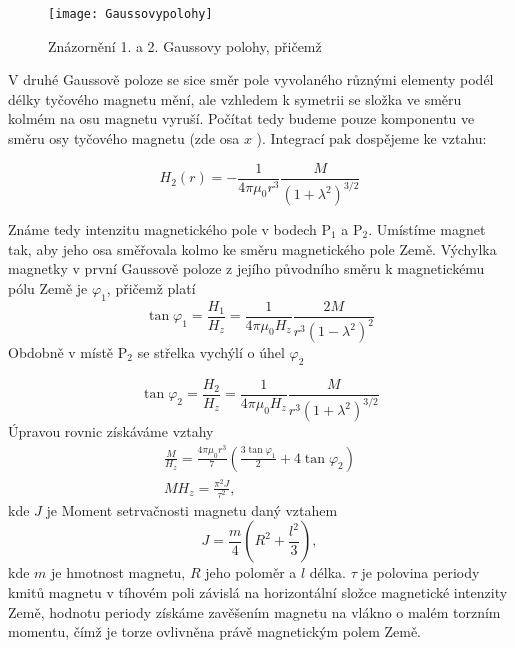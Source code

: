 \documentclass[czech,11pt,a4paper]{article}
\begin{document}
	\begin{figure}[H]
	\begin{center}
		
		\texttt{[image: Gaussovypolohy]} 
		\caption{Znázornění 1. a 2. Gaussovy polohy, přičemž }
	\end{center}
	
	\end{figure} 
	
	\begin{multicols}{2}
	V druhé Gaussově poloze se sice směr pole vyvolaného různými elementy podél délky tyčového magnetu mění, ale vzhledem k symetrii se složka ve směru kolmém na osu magnetu vyruší. Počítat tedy budeme pouze komponentu ve směru osy tyčového magnetu (zde osa $x$ ). Integrací pak dospějeme ke vztahu:
	
	\begin{equation}
		H_{2}(r) =-\frac{1}{4 \pi \mu_{0} r^{3}} \frac{M}{\left(1+\lambda^{2}\right)^{3 / 2}}
	\end{equation}
	
	Známe tedy intenzitu magnetického pole v bodech $\mathrm{P}_{1}$ a $\mathrm{P}_{2}$. Umístíme magnet tak, aby jeho osa směřovala kolmo ke směru magnetického pole Země. Výchylka magnetky v první Gaussově poloze z jejího původního směru k magnetickému pólu Země je $\varphi_{1}$, přičemž platí
	\begin{equation}
		\tan \varphi_{1}=\frac{H_{1}}{H_{z}}=\frac{1}{4 \pi \mu_{0} H_{z}} \frac{2 M}{r^{3}\left(1-\lambda^{2}\right)^{2}}
	\end{equation}
	Obdobně v místě $\mathrm{P}_{2}$ se střelka vychýlí o úhel $\varphi_{2}$
	
\begin{equation}
		\tan \varphi_{2}=\frac{H_{2}}{H_{z}}=\frac{1}{4 \pi \mu_{0} H_{z}} \frac{M}{r^{3}\left(1+\lambda^{2}\right)^{3 / 2}}
\end{equation}
	Úpravou rovnic získáváme vztahy 
	\begin{gather}
		\frac{M}{H_{z}}=\frac{4 \pi \mu_{0} r^{3}}{7}\left(\frac{3 \tan \varphi_{1}}{2}+4 \tan \varphi_{2}\right)\\
		M H_{z}=\frac{\pi^{2} J}{\tau^{2}},
	\end{gather}
	kde $J$ je Moment setrvačnosti magnetu daný vztahem
	\begin{equation}
		J=\frac{m}{4}\left(R^{2}+\frac{l^{2}}{3}\right),
	\end{equation}
	kde $m$ je hmotnost magnetu, $R$ jeho poloměr a $l$ délka.
	$\tau$ je polovina periody kmitů magnetu v tíhovém poli závislá na horizontální složce magnetické intenzity Země, hodnotu periody získáme zavěšením magnetu na vlákno o malém torzním momentu, čímž je torze ovlivněna právě magnetickým polem Země.
	

\end{multicols}
\end{document}
